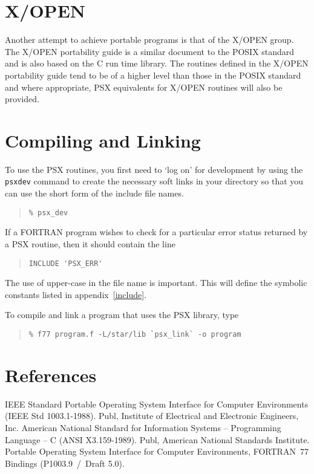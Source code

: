 \documentclass[twoside,11pt]{article}
\newcommand{\stardocinitials}  {SUN}
\newcommand{\stardocnumber}    {121.5}
\newcommand{\stardocname}{\stardocinitials /\stardocnumber}
\newcommand{\xlabel}[1]{}
\renewcommand{\_}{\texttt{\symbol{95}}}
\begin{document}
\section{\xlabel{xopen}X/OPEN}

Another attempt to achieve portable programs is that of the X/OPEN
group. The X/OPEN portability guide is a similar document to the POSIX
standard and is also based on the C run time library. The routines
defined in the X/OPEN portability guide tend to be of a higher level
than those in the POSIX standard and where appropriate, PSX equivalents
for X/OPEN routines will also be provided.

\section{\xlabel{compiling_and_linking}Compiling and Linking}

To use the PSX routines, you first need to `log on' for development by using
the \texttt{psx\_dev} command to create the necessary soft links in your
directory so that you can use the short form of the include file names.

\begin{quote}\begin{verbatim}
% psx_dev
\end{verbatim}\end{quote}

If a FORTRAN program wishes to check for a particular error status returned by
a PSX routine, then it should contain the line

\begin{quote}\begin{verbatim}
INCLUDE 'PSX_ERR'
\end{verbatim}\end{quote}

The use of upper-case in the file name is important. This will define the
symbolic constants listed in appendix~\ref{include}.

To compile and link a program that uses the PSX library, type

\begin{quote}\begin{verbatim}
% f77 program.f -L/star/lib `psx_link` -o program
\end{verbatim}\end{quote}

\section{\xlabel{references}References}
\begin{thebibliography}{9}
IEEE Standard Portable Operating System Interface for Computer
Environments (IEEE Std 1003.1-1988). Publ, Institute of Electrical and
Electronic Engineers, Inc.
American National Standard for Information Systems --
Programming Language -- C (ANSI X3.159-1989). Publ, American National Standards
Institute.
Portable Operating System Interface for Computer
Environments, FORTRAN~77 Bindings (P1003.9~/~Draft 5.0).
\end{thebibliography}
\end{document}

